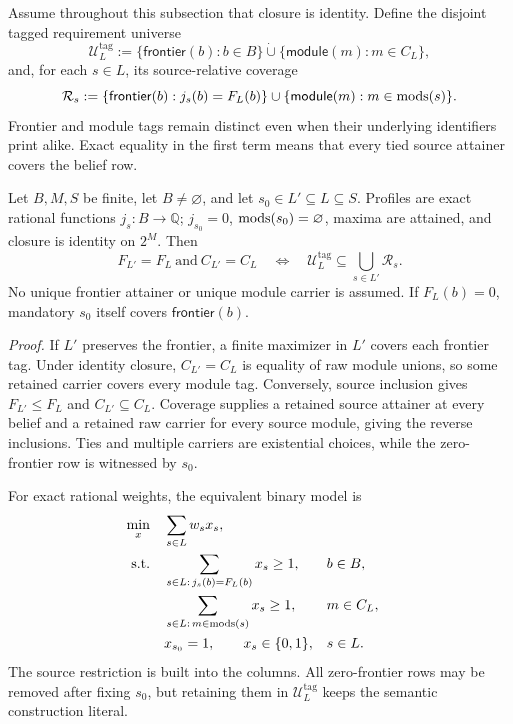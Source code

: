 Assume throughout this subsection that closure is identity.  Define the
disjoint tagged requirement universe
\begin{equation}
 \mathcal U_L^{\mathrm{tag}}
 :=\{\mathsf{frontier}(b):b\in B\}
   \mathbin{\dot\cup}
   \{\mathsf{module}(m):m\in C_L\},
 \label{eq:tagged-requirement-universe}
\end{equation}
and, for each \(s\in L\), its source-relative coverage
\begin{equation}
 \mathcal R_s
 :=\{\mathsf{frontier}(b):j_s(b)=F_L(b)\}
   \cup
   \{\mathsf{module}(m):m\in\operatorname{mods}(s)\}.
 \label{eq:strategy-tagged-coverage}
\end{equation}
Frontier and module tags remain distinct even when their underlying identifiers
print alike.  Exact equality in the first term means that every tied source
attainer covers the belief row.

\begin{theorem}
\label{thm:aor-tagged-cover-equivalence}
Let \(B,M,S\) be finite, let \(B\neq\varnothing\), and let
\(s_0\in L'\subseteq L\subseteq S\).  Profiles are exact rational functions
\(j_s:B\to\mathbb Q\); \(j_{s_0}=0\), \(\operatorname{mods}(s_0)=\varnothing\), maxima are
attained, and closure is identity on \(2^M\).  Then
\begin{equation}
 F_{L'}=F_L\ \text{and}\ C_{L'}=C_L
 \quad\Longleftrightarrow\quad
 \mathcal U_L^{\mathrm{tag}}\subseteq
       \bigcup_{s\in L'}\mathcal R_s.
 \label{eq:tagged-cover-equivalence}
\end{equation}
No unique frontier attainer or unique module carrier is assumed.  If
\(F_L(b)=0\), mandatory \(s_0\) itself covers
\(\mathsf{frontier}(b)\).
\end{theorem}

\noindent\emph{Proof.}
If \(L'\) preserves the frontier, a finite maximizer in \(L'\) covers each
frontier tag.  Under identity closure,
\(C_{L'}=C_L\) is equality of raw module unions, so some retained carrier
covers every module tag.  Conversely, source inclusion gives
\(F_{L'}\leq F_L\) and \(C_{L'}\subseteq C_L\).  Coverage supplies a retained
source attainer at every belief and a retained raw carrier for every source
module, giving the reverse inclusions.  Ties and multiple carriers are
existential choices, while the zero-frontier row is witnessed by \(s_0\).

For exact rational weights, the equivalent binary model is
\begin{align}
 \min_x\quad &\sum_{s\in L}w_sx_s,
     \label{eq:tagged-cover-objective}\\
 \text{s.t.}\quad
 &\sum_{s\in L:\,j_s(b)=F_L(b)}x_s\geq1,
       &&b\in B,
       \label{eq:tagged-frontier-rows}\\
 &\sum_{s\in L:\,m\in\operatorname{mods}(s)}x_s\geq1,
       &&m\in C_L,
       \label{eq:tagged-module-rows}\\
 &x_{s_0}=1,\qquad x_s\in\{0,1\},
       &&s\in L.
       \label{eq:tagged-binary-domain}
\end{align}
The source restriction is built into the columns.  All zero-frontier rows may
be removed after fixing \(s_0\), but retaining them in
\(\mathcal U_L^{\mathrm{tag}}\) keeps the semantic construction literal.

